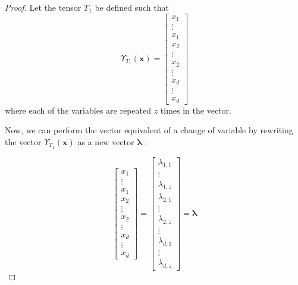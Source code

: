 \documentclass{article}
\theoremstyle{definition}
\theoremstyle{definition}
\begin{document}
\begin{proof}
Let the tensor $T_1$ be defined such that
\begin{equation}
    \Upsilon_{T_1}(\mathbf{x})
    = 
    \begin{bmatrix}
            x_1   \\
            \vdots  \\
            x_1 \\
            x_2 \\
            \vdots \\
            x_2 \\
            \vdots \\
            x_d  \\
            \vdots  \\
            x_d 
    \end{bmatrix}
\end{equation}
where each of the variables are repeated $z$ times in the vector.

Now, we can perform the vector equivalent of a change of variable by rewriting the vector $\Upsilon_{T_1}(\mathbf{x})$ as a new vector $\bm{\lambda}$ :

\begin{equation} \label{lambda}
    \begin{bmatrix}
        x_1   \\
        \vdots  \\
        x_1 \\
        x_2 \\
        \vdots \\
        x_2 \\
        \vdots \\
        x_d   \\
        \vdots  \\
        x_d
\end{bmatrix}
    =
    \begin{bmatrix}
        \lambda_{1, 1} \\
        \vdots \\
        \lambda_{1, z} \\
        \lambda_{2, 1} \\
        \vdots \\
        \lambda_{2, z} \\
        \vdots \\
        \lambda_{d, 1} \\
        \vdots \\
        \lambda_{d, z} 
    \end{bmatrix}
    = \bm{\lambda}
\end{equation}


\end{proof}
\end{document}
